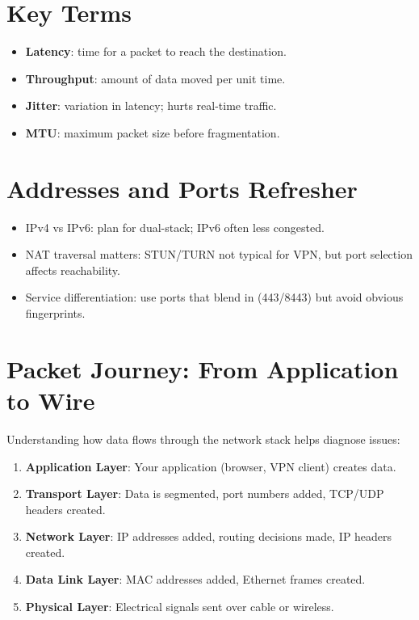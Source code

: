 \section{Key Terms}
\begin{itemize}
    \item \textbf{Latency}: time for a packet to reach the destination.
    \item \textbf{Throughput}: amount of data moved per unit time.
    \item \textbf{Jitter}: variation in latency; hurts real-time traffic.
    \item \textbf{MTU}: maximum packet size before fragmentation.
\end{itemize}

\section{Addresses and Ports Refresher}
\begin{itemize}
    \item IPv4 vs IPv6: plan for dual-stack; IPv6 often less congested.
    \item NAT traversal matters: STUN/TURN not typical for VPN, but port selection affects reachability.
    \item Service differentiation: use ports that blend in (443/8443) but avoid obvious fingerprints.
\end{itemize}

\section{Packet Journey: From Application to Wire}

Understanding how data flows through the network stack helps diagnose issues:

\begin{enumerate}
    \item \textbf{Application Layer}: Your application (browser, VPN client) creates data.
    \item \textbf{Transport Layer}: Data is segmented, port numbers added, TCP/UDP headers created.
    \item \textbf{Network Layer}: IP addresses added, routing decisions made, IP headers created.
    \item \textbf{Data Link Layer}: MAC addresses added, Ethernet frames created.
    \item \textbf{Physical Layer}: Electrical signals sent over cable or wireless.
\end{enumerate}

